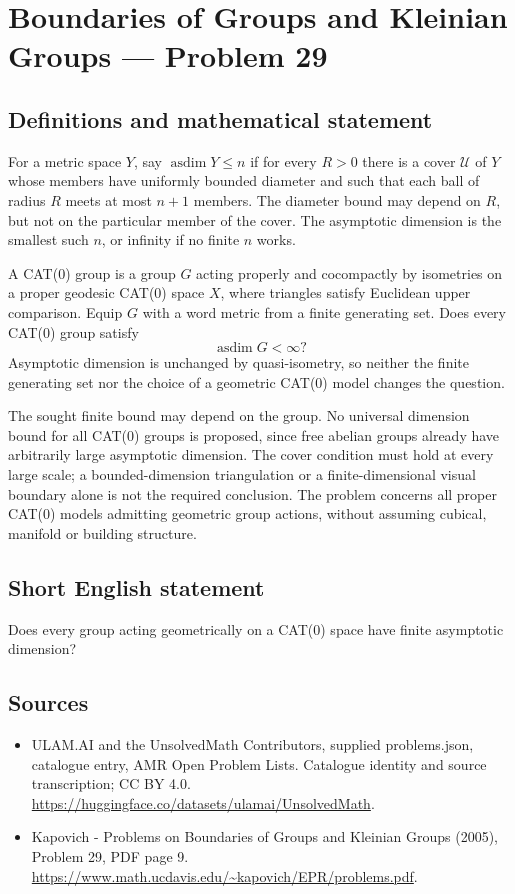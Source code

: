 \documentclass[11pt,a4paper]{article}
\begin{document}
\section*{Boundaries of Groups and Kleinian Groups — Problem 29}\label{statement}

\subsection{Definitions and mathematical statement}
For a metric space $Y$, say $\operatorname{asdim}Y\leq n$ if for every $R>0$ there is a cover $\mathcal U$ of $Y$ whose members have uniformly bounded diameter and such that each ball of radius $R$ meets at most $n+1$ members. The diameter bound may depend on $R$, but not on the particular member of the cover. The asymptotic dimension is the smallest such $n$, or infinity if no finite $n$ works.

A CAT(0) group is a group $G$ acting properly and cocompactly by isometries on a proper geodesic CAT(0) space $X$, where triangles satisfy Euclidean upper comparison. Equip $G$ with a word metric from a finite generating set. Does every CAT(0) group satisfy
\[
 \operatorname{asdim}G<\infty?
\]
Asymptotic dimension is unchanged by quasi-isometry, so neither the finite generating set nor the choice of a geometric CAT(0) model changes the question.

The sought finite bound may depend on the group. No universal dimension bound for all CAT(0) groups is proposed, since free abelian groups already have arbitrarily large asymptotic dimension. The cover condition must hold at every large scale; a bounded-dimension triangulation or a finite-dimensional visual boundary alone is not the required conclusion. The problem concerns all proper CAT(0) models admitting geometric group actions, without assuming cubical, manifold or building structure.
\subsection{Short English statement}
Does every group acting geometrically on a CAT(0) space have finite asymptotic dimension?
\subsection{Sources}
\begin{itemize}
\item[S1] ULAM.AI and the UnsolvedMath Contributors, supplied problems.json, catalogue entry, AMR Open Problem Lists. Catalogue identity and source transcription; CC BY 4.0.
\url{https://huggingface.co/datasets/ulamai/UnsolvedMath}.
\item[S2] Kapovich - Problems on Boundaries of Groups and Kleinian Groups (2005), Problem 29, PDF page 9. 
\url{https://www.math.ucdavis.edu/~kapovich/EPR/problems.pdf}.
\end{itemize}
\end{document}
